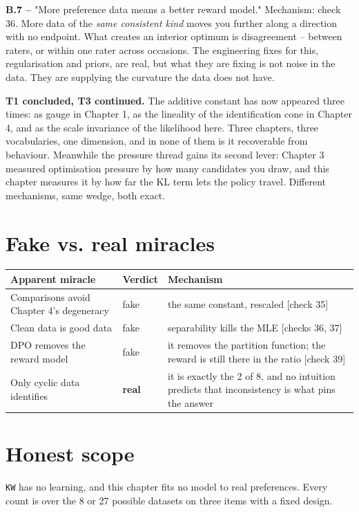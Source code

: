 \textbf{B.7 --} "More preference data means a better reward model." Mechanism: check 36. More data of the \emph{same consistent kind} moves you further along a direction with no endpoint. What creates an interior optimum is disagreement -- between raters, or within one rater across occasions. The engineering fixes for this, regularisation and priors, are real, but what they are fixing is not noise in the data. They are supplying the curvature the data does not have.

\textbf{T1 concluded, T3 continued.} The additive constant has now appeared three times: as gauge in Chapter 1, as the lineality of the identification cone in Chapter 4, and as the scale invariance of the likelihood here. Three chapters, three vocabularies, one dimension, and in none of them is it recoverable from behaviour. Meanwhile the pressure thread gains its second lever: Chapter 3 measured optimisation pressure by how many candidates you draw, and this chapter measures it by how far the KL term lets the policy travel. Different mechanisms, same wedge, both exact.

\section*{Fake vs. real miracles}

\noindent

\noindent
\begin{tabularx}{\textwidth}{XXX}
\toprule
Apparent miracle & Verdict & Mechanism \\
\midrule
Comparisons avoid Chapter 4's degeneracy & fake & the same constant, rescaled [check 35] \\
Clean data is good data & fake & separability kills the MLE [checks 36, 37] \\
DPO removes the reward model & fake & it removes the partition function; the reward is still there in the ratio [check 39] \\
Only cyclic data identifies & \textbf{real} & it is exactly the 2 of 8, and no intuition predicts that inconsistency is what pins the answer \\
\bottomrule
\end{tabularx}
\par\medskip

\section*{Honest scope}

\texttt{KW} has no learning, and this chapter fits no model to real preferences. Every count is over the 8 or 27 possible datasets on three items with a fixed design.


